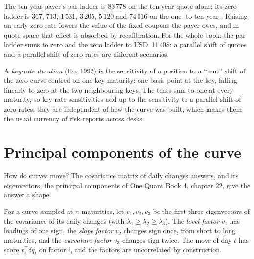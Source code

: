 \begin{example}\label{ex:rc:rates-risk:twoladders}
The ten-year payer's par ladder is $83\,778$ on the ten-year quote alone; its
zero ladder is $367$, $713$, $1\,531$, $3\,205$, $5\,120$ and $74\,016$ on the
one- to ten-year . Raising an early zero rate lowers the value of the
fixed coupons the payer owes, and in quote space that effect is absorbed by
recalibration. For the whole book, the par ladder sums to zero and the zero
ladder to USD~11\,408: a parallel shift of quotes and a parallel shift of zero
rates are different scenarios.
\end{example}

\begin{definition}\label{def:rc:rates-risk:krd}
A \emph{key-rate duration} (Ho, 1992) is the
sensitivity of a position to a ``tent'' shift of the zero curve centred on one
key maturity: one basis point at the key, falling linearly to zero at the two
neighbouring keys. The tents sum to one at every maturity, so key-rate
sensitivities add up to the sensitivity to a parallel shift of zero rates;
they are independent of how the curve was built, which makes them the usual
currency of risk reports across desks.
\end{definition}

\section{Principal components of the curve}

How do curves move? The covariance matrix of daily changes answers, and its
eigenvectors, the principal components of One Quant Book 4, chapter 22, give
the answer a shape.

\begin{definition}\label{def:rc:rates-risk:factors}
For a curve sampled at $n$ maturities, let $v_1, v_2, v_3$ be the first three
eigenvectors of the covariance of its daily changes (with $\lambda_1\ge
\lambda_2\ge\lambda_3$). The \emph{level factor} $v_1$ has
loadings of one sign, the \emph{slope factor} $v_2$
changes sign once, from short to long maturities, and the \emph{curvature
factor} $v_3$ changes sign twice. The move of day $t$ has
score $v_i^\top\delta q_t$ on factor $i$, and the factors are uncorrelated by
construction.
\end{definition}

